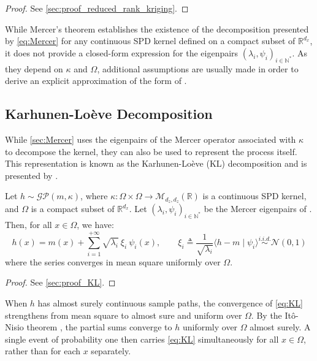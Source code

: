 \begin{proof}
	See \cref{sec:proof_reduced_rank_kriging}.
\end{proof}

\begin{remark}\label{th:eigenpairs}
	While Mercer's theorem establishes the existence of the decomposition presented by \eqref{eq:Mercer} for any continuous SPD kernel defined on a compact subset of $\mathbb{R}^{d_x}$, it does not provide a closed-form expression for the eigenpairs $(\lambda_i,\psi_i)_{i\in\mathbb{N}^*}$. As they depend on $\kappa$ and $\Omega$, additional assumptions are usually made in order to derive an explicit approximation of the form of .
\end{remark}

\subsection{Karhunen-Loève Decomposition}

While \cref{sec:Mercer} uses the eigenpairs of the Mercer operator associated with $\kappa$ to decompose the kernel, they can also be used to represent the process itself. This representation is known as the Karhunen-Loève (KL) decomposition \cite{bib:Karhunen-Loeve} and is presented by .

\begin{proposition}\label{th:KL}
	Let $h\sim\mathcal{GP}(m,\kappa)$, where $\kappa:\Omega\times\Omega\to\mathcal{M}_{d_z,d_z}(\mathbb{R})$ is a continuous SPD kernel, and $\Omega$ is a compact subset of $\mathbb{R}^{d_x}$. Let $(\lambda_i,\psi_i)_{i\in\mathbb{N}^*}$ be the Mercer eigenpairs of . Then, for all $x\in\Omega$, we have:
	\begin{equation}
		h(x)=m(x)+\sum_{i=1}^{+\infty}\sqrt{\lambda_i}\:\xi_i\:\psi_i(x),\qquad\xi_i\triangleq\frac{1}{\sqrt{\lambda_i}}\langle h-m\mid\psi_i\rangle\overset{i.i.d.}{\sim}\mathcal{N}(0,1)\label{eq:KL}
	\end{equation}
	where the series converges in mean square uniformly over $\Omega$.
\end{proposition}

\begin{proof}
	See \cref{sec:proof_KL}.
\end{proof}

\begin{remark}
	When $h$ has almost surely continuous sample paths, the convergence of \eqref{eq:KL} strengthens from mean square to almost sure and uniform over $\Omega$. By the Itô-Nisio theorem \cite{bib:Karhunen-Loeve}, the partial sums converge to $h$ uniformly over $\Omega$ almost surely. A single event of probability one then carries \eqref{eq:KL} simultaneously for all $x\in\Omega$, rather than for each $x$ separately.
\end{remark}

